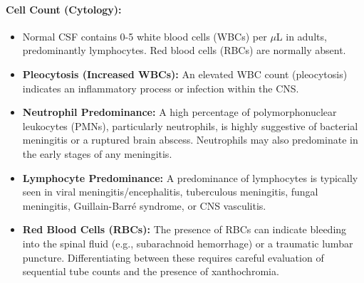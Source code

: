 	\paragraph{Cell Count (Cytology):}
	\begin{itemize}
		\item Normal CSF contains 0-5 white blood cells (WBCs) per $\mu$L in adults, predominantly lymphocytes. Red blood cells (RBCs) are normally absent.
		\item \textbf{Pleocytosis (Increased WBCs):} An elevated WBC count (pleocytosis) indicates an inflammatory process or infection within the CNS.
		\item \textbf{Neutrophil Predominance:} A high percentage of polymorphonuclear leukocytes (PMNs), particularly neutrophils, is highly suggestive of bacterial meningitis or a ruptured brain abscess. Neutrophils may also predominate in the early stages of any meningitis.
		\item \textbf{Lymphocyte Predominance:} A predominance of lymphocytes is typically seen in viral meningitis/encephalitis, tuberculous meningitis, fungal meningitis, Guillain-Barré syndrome, or CNS vasculitis.
		\item \textbf{Red Blood Cells (RBCs):} The presence of RBCs can indicate bleeding into the spinal fluid (e.g., subarachnoid hemorrhage) or a traumatic lumbar puncture. Differentiating between these requires careful evaluation of sequential tube counts and the presence of xanthochromia.
	\end{itemize}
	
